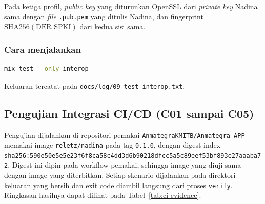 Pada ketiga profil, \textit{public key} yang diturunkan OpenSSL dari \textit{private key} Nadina sama
dengan \textit{file} \texttt{.pub.pem} yang ditulis Nadina, dan fingerprint
$\mathrm{SHA256}(\text{DER SPKI})$ dari kedua sisi sama.

\subsubsection*{Cara menjalankan}
\begin{lstlisting}[language=bash,numbers=none]
mix test --only interop
\end{lstlisting}

Keluaran tercatat pada \texttt{docs/log/09-test-interop.txt}.

\subsection{Pengujian Integrasi CI/CD (C01 sampai C05)}
Pengujian dijalankan di repositori pemakai \texttt{AnmategraKMITB/Anmategra-APP} memakai image
\texttt{reletz/nadina} pada tag \texttt{0.1.0}, dengan digest index
\texttt{sha256:590e50e5e5e23f6f8ca58c4dd3d6b90218dfcc5a5c89eef53bf893e27aaaba72}. Digest ini
dipin pada workflow pemakai, sehingga image yang diuji sama dengan image yang diterbitkan. Setiap
skenario dijalankan pada direktori keluaran yang bersih dan exit code diambil langsung dari
proses \texttt{verify}. Ringkasan hasilnya dapat dilihat pada Tabel~\ref{tab:ci-evidence}.

